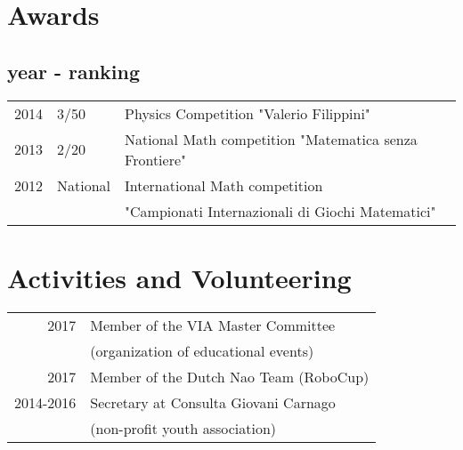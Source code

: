 \documentclass[a4paper]{deedy-resume} %
\begin{document}
\begin{minipage}[t]{0.66\textwidth}

\section{Awards} 
\subsection{year - ranking}
\begin{tabular}{rll}
2014	 & 3/50 & Physics Competition "Valerio Filippini" \\
2013     & 2/20 & National Math competition "Matematica senza Frontiere" \\
2012     & National & International Math competition \\
 & &  "Campionati Internazionali di Giochi Matematici"
\end{tabular}

\sectionspace %


\section{Activities and Volunteering} 

\begin{tabular}{rl}
2017 &  Member of the VIA Master Committee \\
     & (organization of educational events)\\
2017 &  Member of the Dutch Nao Team (RoboCup)\\
2014-2016 &  Secretary at Consulta Giovani Carnago \\
  &(non-profit youth association)\\
\end{tabular}

\sectionspace %


\end{minipage} %

\end{document}
